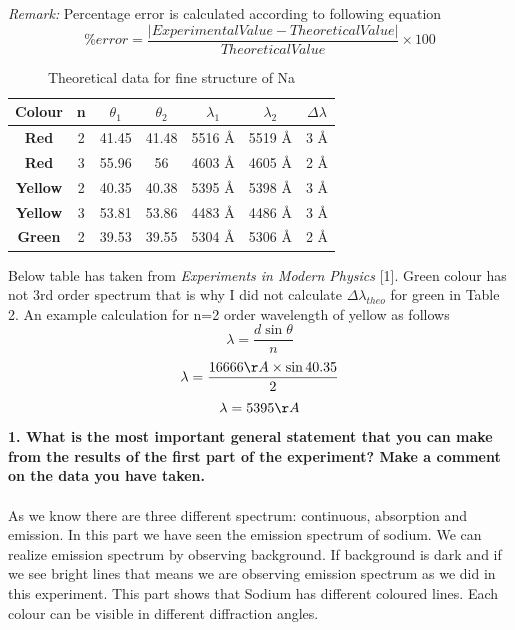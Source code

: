 \documentclass[a4paper,12pt]{article}
\begin{document}
\textit{Remark:} Percentage error is calculated according to following equation
\begin{equation}
\% error= \frac{|Experimental Value - Theoretical Value|}{Theoretical Value} \times 100
\end{equation}
\begin{table}[h!]
	\begin{center}
\begin{tabular}{|c||c|c|c|c|c|c|}
	\hline \textbf{Colour} & n & $\theta_{1}$ & $\theta_{2}$ & $\lambda_{1}$ & $\lambda_{2}$ & $\Delta\lambda$ \\ 
	\hline \textbf{Red} & 2 & 41.45 & 41.48 & 5516 \AA & 5519 \AA & 3 \AA \\ 
	\hline\textbf{ Red} & 3 & 55.96 & 56 & 4603 \AA & 4605 \AA & 2 \AA \\ 
	\hline \textbf{Yellow} & 2 & 40.35 & 40.38 & 5395 \AA & 5398 \AA & 3 \AA \\ 
	\hline \textbf{Yellow} & 3 & 53.81 & 53.86 & 4483 \AA & 4486 \AA & 3 \AA \\ 
	\hline \textbf{Green} & 2 & 39.53 & 39.55 & 5304 \AA & 5306 \AA & 2 \AA \\ 
	\hline 
\end{tabular} 
\caption{Theoretical data for fine structure of Na}
\end{center}
\end{table}
Below table has taken from \textit{Experiments in Modern Physics} [1]. Green colour has not 3rd order spectrum that is why I did not calculate $\Delta\lambda_{theo}$ for green in Table 2. An example calculation for n=2 order wavelength of yellow as follows
\begin{equation}
\lambda=\frac{d \sin \theta}{n}
\end{equation}
\begin{equation}
\lambda=\frac{16666 \AA \times \sin 40.35}{2}
\end{equation}
\begin{equation}
\lambda=5395 \AA
\end{equation}
\textbf{1. What is the most important general statement that you can make from the results of the first part of the experiment? Make a comment on the data you have taken.}\\\\
As we know there are three different spectrum: continuous, absorption and emission. In this part we have seen the emission spectrum of sodium. We can realize  emission spectrum by observing background. If background is dark and if we see bright lines that means we are observing emission spectrum as we did in this experiment. This part shows that Sodium has different coloured lines. Each colour can be visible in different diffraction angles.\\\\
\end{document}
